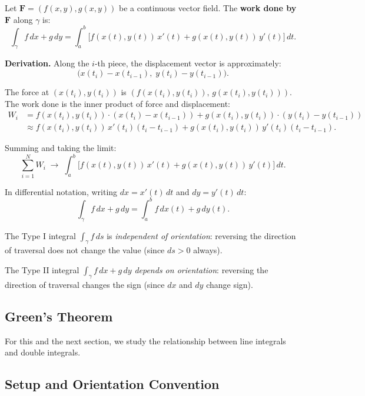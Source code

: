 \documentclass[11pt]{report}
\begin{document}
\begin{definition}
Let $\mathbf{F} = (f(x,y), g(x,y))$ be a continuous vector field. The \textbf{work done by $\mathbf{F}$} along $\gamma$ is:
\[
\int_\gamma f \, dx + g \, dy = \int_a^b \big[ f(x(t), y(t)) \, x'(t) + g(x(t), y(t)) \, y'(t) \big] \, dt.
\]
\end{definition}

\textbf{Derivation.} Along the $i$-th piece, the displacement vector is approximately:
\[
\big( x(t_i) - x(t_{i-1}), \; y(t_i) - y(t_{i-1}) \big).
\]

The force at $(x(t_i), y(t_i))$ is $(f(x(t_i), y(t_i)), \, g(x(t_i), y(t_i)))$. The work done is the inner product of force and displacement:
\begin{align*}
W_i &= f(x(t_i), y(t_i)) \cdot (x(t_i) - x(t_{i-1})) + g(x(t_i), y(t_i)) \cdot (y(t_i) - y(t_{i-1})) \\
&\approx f(x(t_i), y(t_i)) \, x'(t_i)(t_i - t_{i-1}) + g(x(t_i), y(t_i)) \, y'(t_i)(t_i - t_{i-1}).
\end{align*}

Summing and taking the limit:
\[
\sum_{i=1}^N W_i \;\longrightarrow\; \int_a^b \big[ f(x(t), y(t)) \, x'(t) + g(x(t), y(t)) \, y'(t) \big] \, dt.
\]

In differential notation, writing $dx = x'(t) \, dt$ and $dy = y'(t) \, dt$:
\[
\int_\gamma f \, dx + g \, dy = \int_a^b f \, dx(t) + g \, dy(t).
\]

\begin{remark}
The Type I integral $\int_\gamma f \, ds$ is \textit{independent of orientation}: reversing the direction of traversal does not change the value (since $ds > 0$ always).

The Type II integral $\int_\gamma f \, dx + g \, dy$ \textit{depends on orientation}: reversing the direction of traversal changes the sign (since $dx$ and $dy$ change sign).
\end{remark}

\subsection{Green's Theorem}

For this and the next section, we study the relationship between line integrals and double integrals.

\subsection*{Setup and Orientation Convention}
\end{document}
